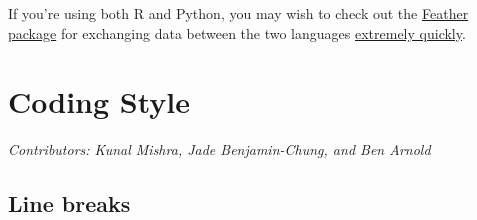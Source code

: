 \documentclass[
]{book}
\begin{document}
If you're using both R and Python, you may wish to check out the \href{https://www.rdocumentation.org/packages/feather/versions/0.3.3}{Feather package} for exchanging data between the two languages \href{https://blog.rstudio.com/2016/03/29/feather/}{extremely quickly}.

\chapter{Coding Style}\label{codingstyle}

\emph{Contributors: Kunal Mishra, Jade Benjamin-Chung, and Ben Arnold}

\section{Line breaks}\label{line-breaks}
\end{document}
